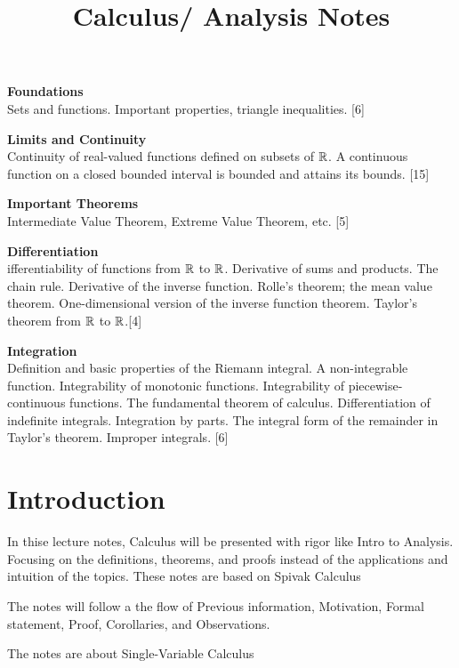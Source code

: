\documentclass[a4paper]{article}
\title{Calculus/ Analysis Notes}
\begin{document}
\maketitle

{\small \noindent\textbf{Foundations}\\
Sets and functions. Important properties, triangle inequalities. \hspace*{\fill} [6]

\vspace{10pt}
\noindent\textbf{Limits and Continuity}\\
Continuity of real-valued functions defined on subsets of $\mathbb{R}$. A continuous function on a closed bounded
interval is bounded and attains its bounds.\hspace*{\fill} [15]

\vspace{10pt}
\noindent\textbf{Important Theorems}\\
Intermediate Value Theorem, Extreme Value Theorem, etc.\hspace*{\fill} [5]

\vspace{10pt}
\noindent\textbf{Differentiation}\\
ifferentiability of functions from $\mathbb{R}$ to $\mathbb{R}$. Derivative of sums and
products. The chain rule. Derivative of the inverse function. Rolle's theorem;
the mean value theorem. One-dimensional version of the inverse function theorem.
Taylor's theorem from $\mathbb{R}$ to $\mathbb{R}$.\hspace*{\fill}[4]

\vspace{10pt}
\noindent\textbf{Integration}\\
Definition and basic properties of the Riemann integral. A non-integrable
function. Integrability of monotonic functions. Integrability of
piecewise-continuous functions. The fundamental theorem of calculus.
Differentiation of indefinite integrals. Integration by parts. The integral form
of the remainder in Taylor's theorem. Improper integrals.\hspace*{\fill} [6]}

\tableofcontents

\setcounter{section}{-1}
\section{Introduction}
In thise lecture notes, Calculus will be presented with rigor like Intro to
Analysis. Focusing on the definitions, theorems, and proofs instead of the
applications and intuition  of the topics. These notes are based on Spivak
Calculus

The notes will follow a the flow of Previous information, Motivation,
Formal statement, Proof, Corollaries, and Observations.

The notes are about Single-Variable Calculus



\end{document}
